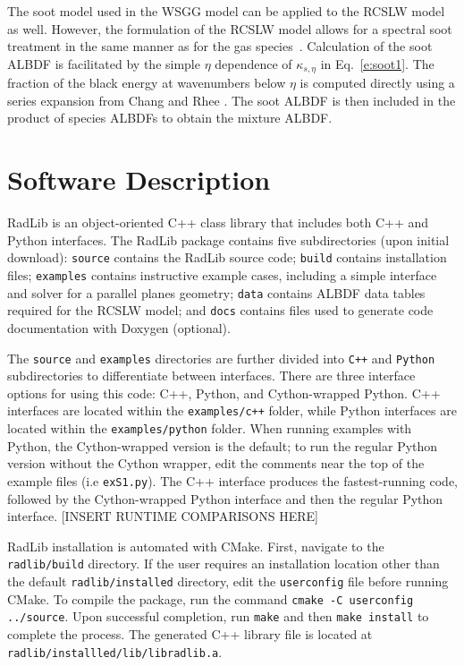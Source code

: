 \documentclass[preprint,12pt, a4paper]{elsarticle}
\begin{document}
The soot model used in the WSGG model can be applied to the RCSLW model as well. However, the formulation of the RCSLW model allows for a spectral soot treatment in the same manner as for the gas species~\cite{Solovjov_2001}. Calculation of the soot ALBDF is facilitated by the simple $\eta$ dependence of $\kappa_{s,\eta}$ in Eq.~\ref{e:soot1}. The fraction of the black energy at wavenumbers below $\eta$ is computed directly using a series expansion from Chang and Rhee \cite{Chang_1984,Solovjov_2001}. The soot ALBDF is then included in the product of species ALBDFs to obtain the mixture ALBDF. 
 

\section{Software Description} \label{s:architechture}

RadLib is an object-oriented C++ class library that includes both C++ and Python interfaces. The RadLib package contains five subdirectories (upon initial download): \texttt{source} contains the RadLib source code; \texttt{build} contains installation files; \texttt{examples} contains instructive example cases, including a simple interface and solver for a parallel planes geometry; \texttt{data} contains ALBDF data tables required for the RCSLW model; and \texttt{docs} contains files used to generate code documentation with Doxygen (optional). 

The \texttt{source} and \texttt{examples} directories are further divided into \texttt{C++} and \texttt{Python} subdirectories to differentiate between interfaces. There are three interface options for using this code: C++, Python, and Cython-wrapped Python. C++ interfaces are located within the \texttt{examples/c++} folder, while Python interfaces are located within the \texttt{examples/python} folder. When running examples with Python, the Cython-wrapped version is the default; to run the regular Python version without the Cython wrapper, edit the comments near the top of the example files (i.e \texttt{ex\textunderscore S1.py}). The C++ interface produces the fastest-running code, followed by the Cython-wrapped Python interface and then the regular Python interface. [INSERT RUNTIME COMPARISONS HERE]

RadLib installation is automated with CMake. First, navigate to the \texttt{radlib/build} directory. If the user requires an installation location other than the default \texttt{radlib/installed} directory, edit the \texttt{user\textunderscore config} file before running CMake. To compile the package, run the command \texttt{cmake -C user\textunderscore config ../source}. Upon successful completion, run \texttt{make} and then \texttt{make install} to complete the process. The generated C++ library file is located at \texttt{radlib/installled/lib/libradlib.a}. 
\end{document}
